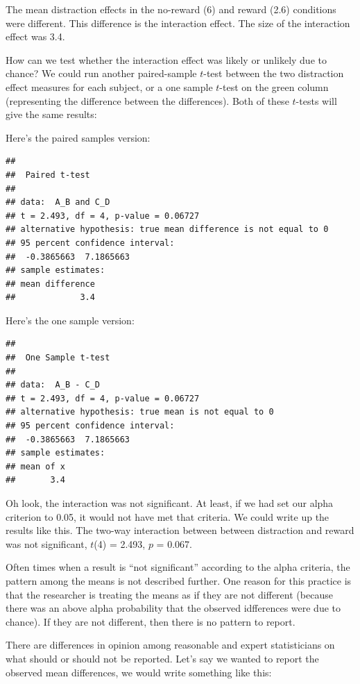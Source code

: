 \documentclass[
]{book}
\begin{document}
The mean distraction effects in the no-reward (6) and reward (2.6) conditions were different. This difference is the interaction effect. The size of the interaction effect was 3.4.

How can we test whether the interaction effect was likely or unlikely due to chance? We could run another paired-sample \(t\)-test between the two distraction effect measures for each subject, or a one sample \(t\)-test on the green column (representing the difference between the differences). Both of these \(t\)-tests will give the same results:

Here's the paired samples version:

\begin{verbatim}
## 
##  Paired t-test
## 
## data:  A_B and C_D
## t = 2.493, df = 4, p-value = 0.06727
## alternative hypothesis: true mean difference is not equal to 0
## 95 percent confidence interval:
##  -0.3865663  7.1865663
## sample estimates:
## mean difference 
##             3.4
\end{verbatim}

Here's the one sample version:

\begin{verbatim}
## 
##  One Sample t-test
## 
## data:  A_B - C_D
## t = 2.493, df = 4, p-value = 0.06727
## alternative hypothesis: true mean is not equal to 0
## 95 percent confidence interval:
##  -0.3865663  7.1865663
## sample estimates:
## mean of x 
##       3.4
\end{verbatim}

Oh look, the interaction was not significant. At least, if we had set our alpha criterion to 0.05, it would not have met that criteria. We could write up the results like this. The two-way interaction between between distraction and reward was not significant, \(t\)(4) = 2.493, \(p\) = 0.067.

Often times when a result is ``not significant'' according to the alpha criteria, the pattern among the means is not described further. One reason for this practice is that the researcher is treating the means as if they are not different (because there was an above alpha probability that the observed idfferences were due to chance). If they are not different, then there is no pattern to report.

There are differences in opinion among reasonable and expert statisticians on what should or should not be reported. Let's say we wanted to report the observed mean differences, we would write something like this:
\end{document}

